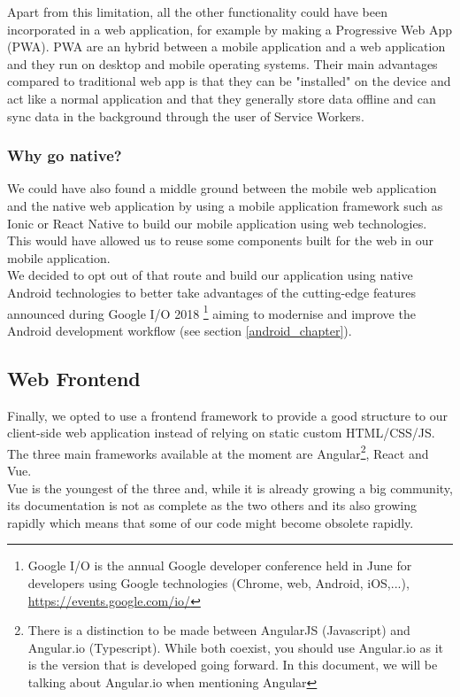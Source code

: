 \documentclass[11pt,a4paper]{report}
\begin{document}
Apart from this limitation, all the other functionality could have been incorporated in a web application, for example by making a Progressive Web App (PWA). PWA are an hybrid between a mobile application and a web application and they run on desktop and mobile operating systems. Their main advantages compared to traditional web app is that they can be "installed" on the device and act like a normal application and that they generally store data offline and can sync data in the background through the user of Service Workers.
\subsubsection{Why go native?}
We could have also found a middle ground between the mobile web application and the native web application by using a mobile application framework such as Ionic or React Native to build our mobile application using web technologies. This would have allowed us to reuse some components built for the web in our mobile application.\\

We decided to opt out of that route and build our application using native Android technologies to better take advantages of the cutting-edge features announced during Google I/O 2018 \footnote{Google I/O is the annual Google developer conference held in June for developers using Google technologies (Chrome, web, Android, iOS,...), \url{https://events.google.com/io/}} aiming to modernise and improve the Android development workflow (see section \ref{android_chapter}).
\subsection{Web Frontend}
Finally, we opted to use a frontend framework to provide a good structure to our client-side web application instead of relying on static custom HTML/CSS/JS.\\

The three main frameworks available at the moment are Angular\footnote{There is a distinction to be made between AngularJS (Javascript) and Angular.io (Typescript). While both coexist, you should use Angular.io as it is the version that is developed going forward. In this document, we will be talking about Angular.io when mentioning Angular}, React and Vue. \\

Vue is the youngest of the three and, while it is already growing a big community, its documentation is not as complete as the two others and its also growing rapidly which means that some of our code might become obsolete rapidly. \\
\end{document}
